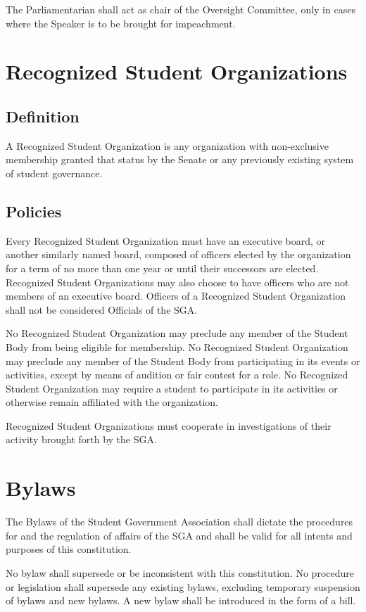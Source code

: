\documentclass[12pt,oneside]{scrreprt}
\begin{document}
The Parliamentarian shall act as chair of the Oversight Committee, only in cases where
the Speaker is to be brought for impeachment.

\chapter{Recognized Student Organizations}

\section{Definition}
A Recognized Student Organization is any organization with non-exclusive membership granted that status by the Senate or any previously existing system of student governance.

\section{Policies}
Every Recognized Student Organization must have an executive board, or another similarly
named board, composed of officers elected by the organization for a term of no more than one year or until their successors are elected. Recognized Student Organizations may also choose to have officers who are not members of an executive board. Officers of a Recognized Student Organization shall not be considered Officials of the SGA.

No Recognized Student Organization may preclude any member of the Student Body from being eligible for membership. No Recognized Student Organization may preclude any member of the Student Body from participating in its events or activities, except by means of audition or fair contest for a role. No Recognized Student Organization may require a student to participate in its activities or otherwise remain affiliated with the organization.

Recognized Student Organizations must cooperate in investigations of their activity
brought forth by the SGA.

\chapter{Bylaws}
The Bylaws of the Student Government Association shall dictate the procedures for and the regulation of affairs of the SGA and shall be valid for all intents and purposes of this constitution.

No bylaw shall supersede or be inconsistent with this constitution. No procedure or legislation shall supersede any existing bylaws, excluding temporary suspension of bylaws and new bylaws. A new bylaw shall be introduced in the form of a bill.
\end{document}
